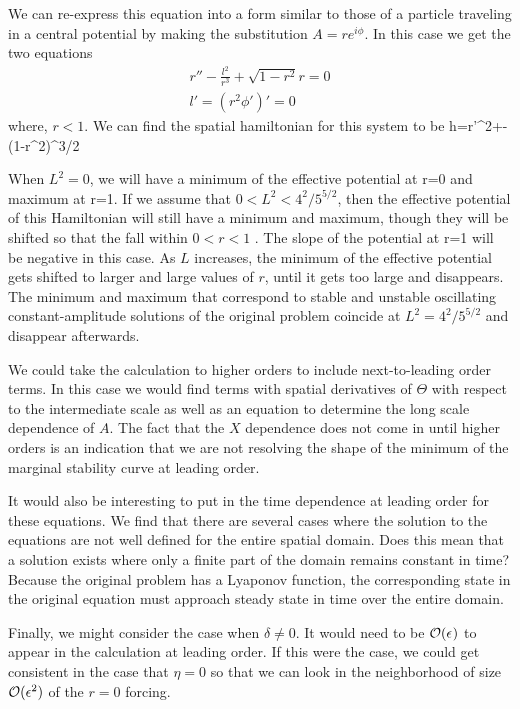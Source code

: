 \documentclass[../main/WavelengthCompetition.tex]{subfiles}
\begin{document}
We can re-express this equation into a form similar to those of a particle traveling in a central potential by making the substitution $A=r e^{i\phi}$. In this case we get the two equations
\begin{subequations}
\begin{align}
r''- \frac{l^2}{r^3}+\sqrt{1-r^2}r=0\\
l'=(r^2 \phi')'=0
\end{align}
\end{subequations}
where, $r<1$.  We can find the spatial hamiltonian for this system to be
\beqn
h=r'^2+-(1-r^2)^{3/2}
\eeqn
 
When $L^2=0$, we will have a minimum of the effective potential at r=0 and maximum at r=1.  If we assume that $0<L^2< 4^2/5^{5/2}$, then the effective potential of this Hamiltonian will still have a minimum and maximum, though they will be shifted so that the fall within $0<r<1$ .  The slope of the potential at r=1 will be negative in this case.  As $L$ increases, the minimum of the effective potential gets shifted to larger and large values of $r$, until it gets too large and disappears.  The minimum and maximum that correspond to stable and unstable oscillating constant-amplitude solutions of the original problem coincide at $L^2=4^2/5^{5/2}$ and disappear afterwards. 

We could take the calculation to higher orders to include next-to-leading order terms.  In this case we would find terms with spatial derivatives of $\Theta$ with respect to the intermediate scale as well as an equation to determine the long scale dependence of $A$.  The fact that the $X$ dependence does not come in until higher orders is an indication that we are not resolving the shape of the minimum of the marginal stability curve at leading order.  

It would also be interesting to put in the time dependence at leading order for these equations.  We find that there are several cases where the solution to the equations are not well defined for the entire spatial domain.  Does this mean that a solution exists where only a finite part of the domain remains constant in time?  Because the original problem has a Lyaponov function, the corresponding state in the original equation must approach steady state in time over the entire domain. 

Finally, we might consider the case when $\delta \neq 0$.  It would need to be $\mathcal{O}(\epsilon^{})$ to appear in the calculation at leading order.  If this were the case, we could get consistent in the case that $\eta=0$ so that we can look in the neighborhood of size $\mathcal{O}(\epsilon^{2})$  of the $r=0$ forcing.
\end{document}
